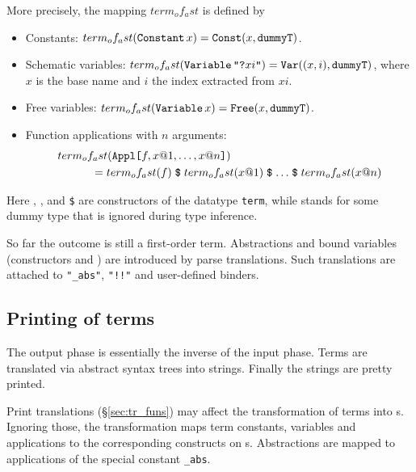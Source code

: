 More precisely, the mapping $term_of_ast$
is defined by
\begin{itemize}
\item Constants: $term_of_ast(\mathop{\mbox{\tt Constant}}\nolimits x) = \mathop{\mbox{\tt Const}}\nolimits (x,
  \mbox{\tt dummyT})$.

\item Schematic variables: $term_of_ast(\mathop{\mbox{\tt Variable}}\nolimits \mbox{\tt "?}xi\mbox{\tt "}) =
  \mathop{\mbox{\tt Var}}\nolimits ((x, i), \mbox{\tt dummyT})$, where $x$ is the base name and $i$
  the index extracted from $xi$.

\item Free variables: $term_of_ast(\mathop{\mbox{\tt Variable}}\nolimits x) = \mathop{\mbox{\tt Free}}\nolimits (x,
  \mbox{\tt dummyT})$.

\item Function applications with $n$ arguments:
    \begin{eqnarray*}
      \lefteqn{term_of_ast(\Appl{f, x@1, \ldots, x@n})} \\
      &&\qquad{}= term_of_ast(f) \ttapp
         term_of_ast(x@1) \ttapp \ldots \ttapp term_of_ast(x@n)
    \end{eqnarray*}
\end{itemize}
Here , ,  and
\verb|$| are constructors of the datatype {\tt term},
while  stands for some dummy type that is ignored during
type inference.

So far the outcome is still a first-order term.  Abstractions and bound
variables (constructors  and ) are introduced
by parse translations.  Such translations are attached to {\tt "_abs"},
{\tt "!!"} and user-defined binders.


\subsection{Printing of terms}
The output phase is essentially the inverse of the input phase.  Terms are
translated via abstract syntax trees into strings.  Finally the strings are
pretty printed.

Print translations (\S\ref{sec:tr_funs}) may affect the transformation of
terms into \AST{}s.  Ignoring those, the transformation maps
term constants, variables and applications to the corresponding constructs
on \AST{}s.  Abstractions are mapped to applications of the special
constant {\tt _abs}.

